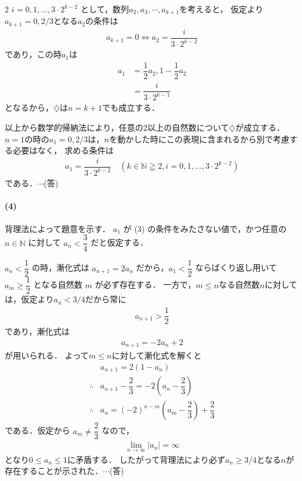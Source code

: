 \documentclass[../../main.tex]{subfiles}
\begin{document}
\begin{multicols}{2}
  $i=0,1,\dots,3 \cdot 2^{k-2}$ として，数列$a_2,a_3,\cdots,a_{k+1}$を考えると，
  仮定より$a_{k+1}=0,2/3$となる$a_2$の条件は
  \begin{align}
    a_{k+1}=0 \iff a_{2} = \dfrac{i}{3 \cdot 2^{k-2}}
  \end{align}
  であり，この時$a_1$は
  \begin{align}
    a_1
    & = \dfrac{1}{2}a_{2}, 1-\dfrac{1}{2}a_{2} \\
    & = \dfrac{i}{3 \cdot 2^{k-1}}
  \end{align}
  となるから，$\diamondsuit$は$n=k+1$でも成立する．

  以上から数学的帰納法により，任意の$2$以上の自然数について$\diamondsuit$が成立する．
  $n=1$の時の$a_1=0,2/3$は，$n$を動かした時にこの表現に含まれるから別で考慮する必要はなく，
  求める条件は
  \begin{align}
    a_{1}  = \dfrac{i}{3 \cdot 2^{k-2}} \quad (k \in \mathbb{N} \geqq 2, i=0,1,\dots,3 \cdot 2^{k-2})
  \end{align}
  である．$\cdots$(答)

  \paragraph{(4)}
  背理法によって題意を示す．
  $a_1$ が (3) の条件をみたさない値で，かつ任意の $n \in \mathbb{N}$ に対して $a_n < \dfrac{3}{4}$ だと仮定する．

  $a_n < \dfrac{1}{2}$ の時，漸化式は $a_{n+1} = 2a_n$ だから，$a_1 < \dfrac{1}{2}$ ならばくり返し用いて $a_m \ge \dfrac{1}{2}$ となる自然数 $m$ が必ず存在する．
  一方で，$m \le n$なる自然数$n$に対しては，仮定より$a_n < 3/4$だから常に
  \begin{align}
    a_{n+1} > \dfrac{1}{2}
  \end{align}
  であり，漸化式は
  \begin{align}
    a_{n+1} = -2 a_{n} + 2
  \end{align}
  が用いられる．
  よって$m \le n$に対して漸化式を解くと
  \begin{align}
    & a_{n+1} = 2(1-a_n)                                            \\
    \therefore
    & a_{n+1} - \dfrac{2}{3} = -2\left(a_n - \dfrac{2}{3}\right)      \\
    \therefore
    & a_n = (-2)^{n-m} \left(a_m - \dfrac{2}{3}\right) + \dfrac{2}{3}
  \end{align}
  である．仮定から $a_m \ne \dfrac{2}{3}$ なので，
  \begin{align}
    \lim_{n\to\infty} |a_n| = \infty
  \end{align}
  となり$0 \le a_n \le 1$に矛盾する．
  したがって背理法により必ず$a_n \ge 3/4$となる$n$が存在することが示された．$\cdots$(答)


\end{multicols}
\end{document}
